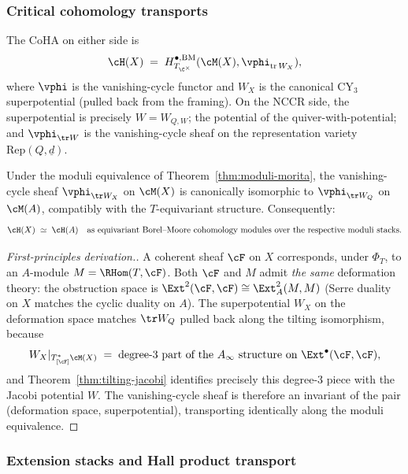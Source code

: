 \subsubsection{Critical cohomology transports}

The CoHA on either side is
\[
 \cH(X) \;=\; H^{\bullet,\mathrm{BM}}_{T_{\C^\times}}(\cM(X), \vphi_{\mathrm{tr}\,W_X}),
\]
where $\vphi$ is the vanishing-cycle functor and $W_X$ is the canonical CY$_3$
superpotential (pulled back from the framing). On the NCCR side, the
superpotential is precisely $W = W_{Q,W}$; the potential of the
quiver-with-potential; and $\vphi_{\tr W}$ is the vanishing-cycle sheaf on
the representation variety $\mathrm{Rep}(Q, \underline{d})$.

\begin{theorem}
\label{thm:vanishing-cycle-transport}
Under the moduli equivalence of
Theorem~\ref{thm:moduli-morita}, the vanishing-cycle sheaf
$\vphi_{\tr W_X}$ on $\cM(X)$ is canonically isomorphic to
$\vphi_{\tr W_Q}$ on $\cM(A)$, compatibly with the $T$-equivariant structure.
Consequently:
\[
 \cH(X) \;\simeq\; \cH(A) \quad\text{as equivariant Borel--Moore
 cohomology modules over the respective moduli stacks.}
\]
\end{theorem}

\begin{proof}[First-principles derivation.]
A coherent sheaf $\cF$ on $X$ corresponds, under $\Phi_T$, to an $A$-module
$M = \RHom(T, \cF)$. Both $\cF$ and $M$ admit \emph{the same} deformation
theory: the obstruction space is $\Ext^{2}(\cF, \cF) \cong \Ext^{2}_A(M, M)$
(Serre duality on $X$ matches the cyclic duality on $A$). The superpotential
$W_X$ on the deformation space matches $\tr W_Q$ pulled back along the tilting
isomorphism, because
\[
 W_X|_{T^{*}_{[\cF]} \cM(X)} \;=\;
 \text{degree-3 part of the $A_\infty$ structure on $\Ext^\bullet(\cF, \cF)$},
\]
and Theorem~\ref{thm:tilting-jacobi} identifies precisely this degree-3 piece
with the Jacobi potential $W$. The vanishing-cycle sheaf is therefore an
invariant of the pair (deformation space, superpotential), transporting
identically along the moduli equivalence.
\end{proof}

\subsubsection{Extension stacks and Hall product transport}

